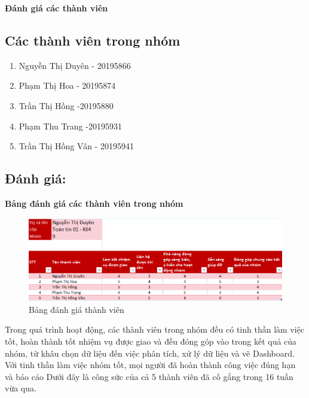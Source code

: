 \bigskip

\newpage
\newpage
\fontsize{22pt}{16pt}\selectfont
\begin{center}
    {\bfseries Đánh giá các thành viên}
\end{center}
\fontsize{13pt}{16pt}\selectfont
\bigskip

\subsection*{Các thành viên trong nhóm}
\begin{enumerate}
    \item  Nguyễn Thị Duyên - 20195866
    \item  Phạm Thị Hoa - 20195874
    \item  Trần Thị Hồng -20195880
    \item Phạm Thu Trang -20195931
    \item Trần Thị Hồng Vân - 20195941
\end{enumerate}

\subsection*{Đánh giá: }
\textbf{Bảng đánh giá các thành viên trong nhóm}
\begin{center}
            \begin{figure}[!h]
                \centering
                \includegraphics[scale = 0.8]{contents/Bảng đánh giá thành viên.PNG}
              \caption{Bảng đánh giá thành viên}
            \end{figure}
\end{center}
Trong quá trình hoạt động, các thành viên trong nhóm đều có tinh thần làm
việc tốt, hoàn thành tốt nhiệm vụ được giao và đều đóng góp vào trong kết quả
của nhóm, từ khâu chọn dữ liệu đến việc phân tích, xử lý dữ liệu và vẽ Dashboard.
Với tinh thần làm việc nhóm tốt, mọi người đã hoàn thành công việc đúng hạn và báo cáo Dưới đây là công sức của cả 5 thành viên đã cố gắng trong 16 tuần vừa qua.


